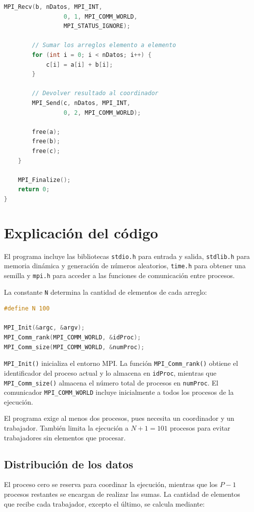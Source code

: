 \documentclass[12pt,a4paper]{article}
\begin{document}
\begin{lstlisting}[language=C]
        MPI_Recv(b, nDatos, MPI_INT,
                 0, 1, MPI_COMM_WORLD,
                 MPI_STATUS_IGNORE);

        // Sumar los arreglos elemento a elemento
        for (int i = 0; i < nDatos; i++) {
            c[i] = a[i] + b[i];
        }

        // Devolver resultado al coordinador
        MPI_Send(c, nDatos, MPI_INT,
                 0, 2, MPI_COMM_WORLD);

        free(a);
        free(b);
        free(c);
    }

    MPI_Finalize();
    return 0;
}
\end{lstlisting}

\section{Explicación del código}

El programa incluye las bibliotecas \texttt{stdio.h} para entrada y salida,
\texttt{stdlib.h} para memoria dinámica y generación de números aleatorios,
\texttt{time.h} para obtener una semilla y \texttt{mpi.h} para acceder a las
funciones de comunicación entre procesos.

La constante \texttt{N} determina la cantidad de elementos de cada arreglo:

\begin{lstlisting}[language=C]
#define N 100

MPI_Init(&argc, &argv);
MPI_Comm_rank(MPI_COMM_WORLD, &idProc);
MPI_Comm_size(MPI_COMM_WORLD, &numProc);
\end{lstlisting}

\texttt{MPI\_Init()} inicializa el entorno MPI. La función
\texttt{MPI\_Comm\_rank()} obtiene el identificador del proceso actual y lo
almacena en \texttt{idProc}, mientras que \texttt{MPI\_Comm\_size()} almacena
el número total de procesos en \texttt{numProc}. El comunicador
\texttt{MPI\_COMM\_WORLD} incluye inicialmente a todos los procesos de la
ejecución.

El programa exige al menos dos procesos, pues necesita un coordinador y un
trabajador. También limita la ejecución a \(N+1=101\) procesos para evitar
trabajadores sin elementos que procesar.

\subsection{Distribución de los datos}

El proceso cero se reserva para coordinar la ejecución, mientras que los
\(P-1\) procesos restantes se encargan de realizar las sumas. La cantidad de
elementos que recibe cada trabajador, excepto el último, se calcula mediante:
\end{document}

